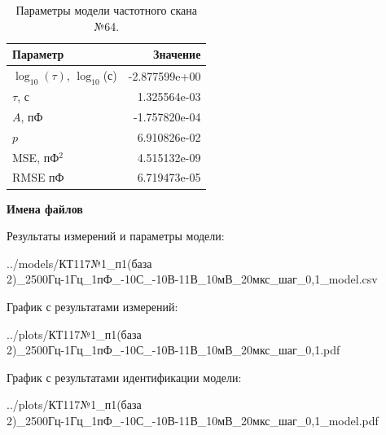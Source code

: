 \begin{table}[!ht]
    \centering
    \caption{Параметры модели частотного скана №64.}
    \begin{tabular}{|l|r|}
        \hline
        Параметр                                       & Значение                  \\ \hline
        $\log_{10}(\tau)$, $\log_{10}$(с)              & -2.877599e+00             \\ \hline
        $\tau$, с                                      & 1.325564e-03              \\ \hline
        $A$, пФ                                        & -1.757820e-04             \\ \hline
        $p$                                            & 6.910826e-02              \\ \hline
        MSE, пФ$^2$                                    & 4.515132e-09              \\ \hline
        RMSE пФ                                        & 6.719473e-05              \\ \hline
    \end{tabular}
    \label{table:frequency_scan_model_64}
\end{table}

\textbf{Имена файлов}

Результаты измерений и параметры модели:

\scriptsize../models/КТ117№1\_п1(база 2)\_2500Гц-1Гц\_1пФ\_-10С\_-10В-11В\_10мВ\_20мкс\_шаг\_0,1\_model.csv
\normalsize

График с результатами измерений:

\scriptsize../plots/КТ117№1\_п1(база 2)\_2500Гц-1Гц\_1пФ\_-10С\_-10В-11В\_10мВ\_20мкс\_шаг\_0,1.pdf
\normalsize

График с результатами идентификации модели:

\scriptsize../plots/КТ117№1\_п1(база 2)\_2500Гц-1Гц\_1пФ\_-10С\_-10В-11В\_10мВ\_20мкс\_шаг\_0,1\_model.pdf
\normalsize

